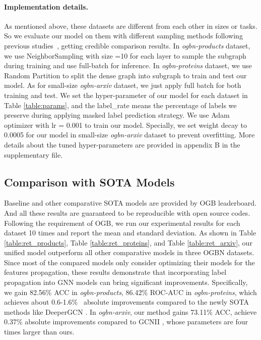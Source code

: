 \paragraph{Implementation details.}  As mentioned above, these datasets are different from each other in sizes or tasks. So we evaluate our model on them with different sampling methods following previous studies~\cite{li2020deepergcn}, getting credible comparison results. In \emph{ogbn-products} dataset, we use NeighborSampling with size =10 for each layer to sample the subgraph during training and use full-batch for inference. In \emph{ogbn-proteins} dataset, we use Random Partition to split the dense graph into subgraph to train and test our model. As for small-size \emph{ogbn-arxiv} dataset, we just apply full batch for both training and test. We set the hyper-parameter of our model for each dataset in Table \ref{table:params}, and the label\_rate means the percentage of labels we preserve during applying masked label prediction strategy. We use Adam optimizer with lr = 0.001 to train our model. Specially, we set weight decay to 0.0005 for our model in small-size \emph{ogbn-arxiv} dataset to prevent overfitting. More details about the tuned hyper-parameters are provided in appendix B in the supplementary file.
 




\subsection{Comparison with SOTA Models}
Baseline and other comparative SOTA models are provided by OGB leaderboard. And all these results are guaranteed to be reproducible with open source codes. Following the requirement of OGB, we run our experimental results for each dataset 10 times and report the mean and standard deviation. As shown in Table \ref{table:ret_products}, Table \ref{table:ret_proteins}, and Table \ref{table:ret_arxiv}, our unified model outperform all other comparative models in three OGBN datasets.
Since most of the compared models only consider optimizing their models for the features propagation, these results demonstrate that incorporating label propagation into GNN models can bring significant improvements.
Specifically, we gain 82.56\% ACC in \emph{ogbn-products}, 86.42\% ROC-AUC in \emph{ogbn-proteins}, which achieves about 0.6-1.6\%  absolute improvements compared to the newly SOTA methods like DeeperGCN \cite{li2020deepergcn}. In \emph{ogbn-arxiv}, our method gains 73.11\% ACC, achieve 0.37\% absolute improvements compared to GCNII \cite{chen2020simple}, whose parameters are four times larger than ours. 


